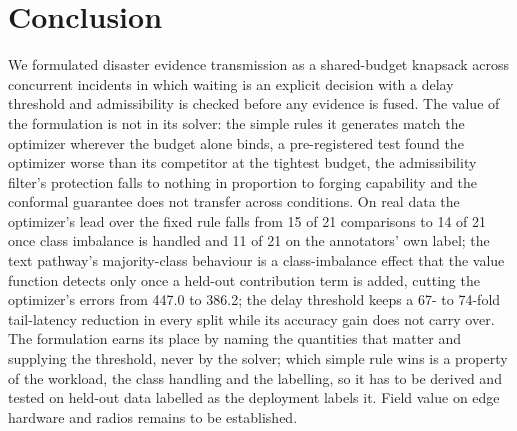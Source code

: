\section{Conclusion}
We formulated disaster evidence transmission as a shared-budget knapsack across concurrent incidents in which waiting is an explicit decision with a delay threshold and admissibility is checked before any evidence is fused. The value of the formulation is not in its solver: the simple rules it generates match the optimizer wherever the budget alone binds, a pre-registered test found the optimizer worse than its competitor at the tightest budget, the admissibility filter's protection falls to nothing in proportion to forging capability and the conformal guarantee does not transfer across conditions. On real data the optimizer's lead over the fixed rule falls from 15 of 21 comparisons to 14 of 21 once class imbalance is handled and 11 of 21 on the annotators' own label; the text pathway's majority-class behaviour is a class-imbalance effect that the value function detects only once a held-out contribution term is added, cutting the optimizer's errors from 447.0 to 386.2; the delay threshold keeps a 67- to 74-fold tail-latency reduction in every split while its accuracy gain does not carry over. The formulation earns its place by naming the quantities that matter and supplying the threshold, never by the solver; which simple rule wins is a property of the workload, the class handling and the labelling, so it has to be derived and tested on held-out data labelled as the deployment labels it. Field value on edge hardware and radios remains to be established.
